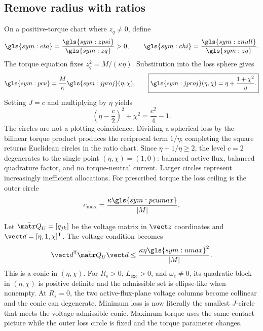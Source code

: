 

\subsection{Remove radius with ratios}

On a positive-torque chart where \(z_q\neq0\), define
\begin{equation}
 \gls{sym:eta}=\frac{\gls{sym:zpsi}}{\gls{sym:zq}}>0,
 \qquad \gls{sym:chi}=\frac{\gls{sym:znull}}{\gls{sym:zq}}.
 \label{eq:projective-coordinates}
\end{equation}
The torque equation fixes
\(z_q^2=M/(\kappa\eta)\). Substitution into the loss sphere gives
\begin{equation}
 \gls{sym:pcu}=\frac{M}{\kappa}\gls{sym:jproj}(\eta,\chi),
 \qquad
 \boxed{\gls{sym:jproj}(\eta,\chi)=
 \eta+\frac{1+\chi^2}{\eta}.}
 \label{eq:J-projective}
\end{equation}
Setting \(J=c\) and multiplying by \(\eta\) yields
\begin{equation}
 \boxed{\left(\eta-\frac c2\right)^2+\chi^2
 =\frac{c^2}{4}-1.}
 \label{eq:J-circles}
\end{equation}
The circles are not a plotting coincidence. Dividing a spherical loss by the
bilinear torque product produces the reciprocal term \(1/\eta\); completing
the square returns Euclidean circles in the ratio chart. Since
\(\eta+1/\eta\geq2\), the level \(c=2\) degenerates to the single point
\((\eta,\chi)=(1,0)\): balanced active flux, balanced quadrature factor, and
no torque-neutral current. Larger circles represent increasingly inefficient
allocations. For prescribed torque the loss ceiling is the outer circle
\begin{equation}
 c_{\max}=\frac{\kappa\gls{sym:pcumax}}{|M|}.
 \label{eq:outer-loss-circle}
\end{equation}

Let \(\bar{\matr Q}_U=[q_{jk}]\) be the voltage matrix in \(\vect z\)
coordinates and \(\vect d=[\eta,1,\chi]^{\mathsf T}\). The voltage condition
becomes
\begin{equation}
 \vect d^{\mathsf T}\bar{\matr Q}_U\vect d
 \leq\frac{\kappa\eta\gls{sym:umax}^2}{|M|}.
 \label{eq:projective-voltage}
\end{equation}
This is a conic in \((\eta,\chi)\). For \(R_s>0\), \(L_{\mathrm{exc}}>0\),
and \(\omega_e\neq0\), its quadratic block in \((\eta,\chi)\) is positive
definite and the admissible set is ellipse-like when nonempty. At
\(R_s=0\), the two active-flux-plane voltage columns become collinear and the
conic can degenerate. Minimum loss is now literally the smallest \(J\)-circle
that meets the voltage-admissible conic. Maximum torque uses the same contact
picture while the outer loss circle is fixed and the torque parameter changes.

